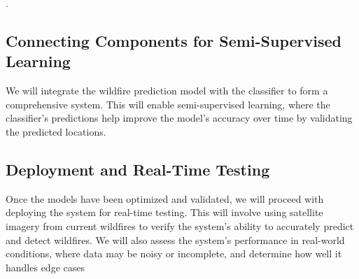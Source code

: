 \documentclass[conference]{IEEEtran}
\begin{document}

.



\subsection{Connecting Components for Semi-Supervised Learning}
We will integrate the wildfire prediction model with the classifier to form a comprehensive system. This will enable semi-supervised learning, where the classifier's predictions help improve the model's accuracy over time by validating the predicted locations.

\subsection{Deployment and Real-Time Testing}
Once the models have been optimized and validated, we will proceed with deploying the system for real-time testing. This will involve using satellite imagery from current wildfires to verify the system's ability to accurately predict and detect wildfires. We will also assess the system's performance in real-world conditions, where data may be noisy or incomplete, and determine how well it handles edge cases
\end{document}
